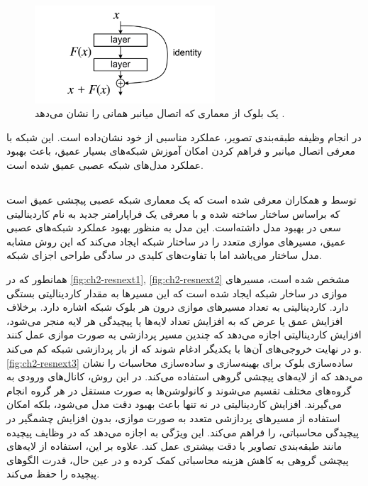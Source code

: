 \begin{figure}[h]
    \centering
    \includegraphics[width=0.6\textwidth]{Images/Chapter2/ResBlock.png}
    \caption{یک بلوک از معماری 
    که اتصال میانبر همانی را نشان می‌دهد
    \cite{wikipediaResidualNeural}.}
    \label{fig:ch-2resnet_block}
\end{figure}
 در انجام وظیفه طبقه‌بندی تصویر، عملکرد مناسبی از خود نشان‌داده است. این شبکه با معرفی اتصال میانبر و  فراهم کردن امکان آموزش شبکه‌های بسیار عمیق، باعث بهبود عملکرد مدل‌های شبکه عصبی عمیق شده‌ است.


\subsection{}

توسط 
\cite{xie2017aggregated}
و همکاران معرفی شده است که 
یک معماری شبکه عصبی پیچشی عمیق است که براساس ساختار 
ساخته شده و با معرفی یک فراپارامتر
 جدید به نام کاردینالیتی
  سعی در بهبود مدل 
  داشته‌است.
 این مدل به منظور بهبود عملکرد شبکه‌های عصبی عمیق،  مسیرهای موازی متعدد را در ساختار شبکه ایجاد می‌کند که این روش مشابه مدل ساختار
می‌باشد اما با تفاوت‌های کلیدی در سادگی طراحی اجزای شبکه.

همانطور که در 
\autoref{fig:ch2-resnext1}, \autoref{fig:ch2-resnext2}
مشخص شده است، مسیرهای موازی در ساخار شبکه ایجاد شده است که این مسیرها به مقدار کاردینالیتی بستگی دارد.
کاردینالیتی به تعداد مسیرهای موازی درون هر بلوک شبکه اشاره دارد. برخلاف افزایش عمق یا عرض که به افزایش تعداد لایه‌ها یا پیچیدگی هر لایه منجر می‌شود، افزایش کاردینالیتی اجازه می‌دهد که چندین مسیر پردازشی به صورت موازی عمل کنند و در نهایت خروجی‌های آن‌ها با یکدیگر ادغام شوند که از بار پردازشی شبکه کم می‌کند.
\autoref{fig:ch2-resnext3}
ساده‌سازی بلوک 
برای بهینه‌سازی و ساده‌سازی محاسبات را نشان می‌دهد که از لایه‌های پیچشی گروهی استفاده می‌کند. در این روش، کانال‌های 
ورودی به گروه‌های مختلف تقسیم می‌شوند و کانولوشن‌ها به صورت مستقل در هر گروه انجام می‌گیرند.
افزایش کاردینالیتی در  نه تنها باعث بهبود دقت مدل می‌شود، بلکه امکان استفاده از مسیرهای پردازشی متعدد به صورت موازی، بدون افزایش چشمگیر در پیچیدگی محاسباتی، را فراهم می‌کند. این ویژگی به  اجازه می‌دهد که در وظایف پیچیده مانند طبقه‌بندی تصاویر با دقت بیشتری عمل کند. علاوه بر این، استفاده از لایه‌های پیچشی گروهی به کاهش هزینه محاسباتی کمک کرده و در عین حال، قدرت الگوهای پیچیده را حفظ می‌کند.

